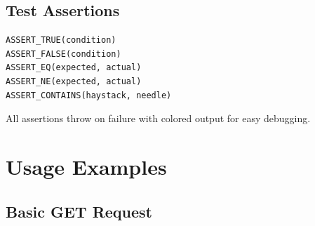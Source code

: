 \documentclass[11pt,a4paper]{article}
\begin{document}
\subsection{Test Assertions}

\begin{lstlisting}[caption=Test Macros]
ASSERT_TRUE(condition)
ASSERT_FALSE(condition)
ASSERT_EQ(expected, actual)
ASSERT_NE(expected, actual)
ASSERT_CONTAINS(haystack, needle)
\end{lstlisting}

All assertions throw on failure with colored output for easy debugging.

\newpage
\section{Usage Examples}

\subsection{Basic GET Request}
\end{document}

